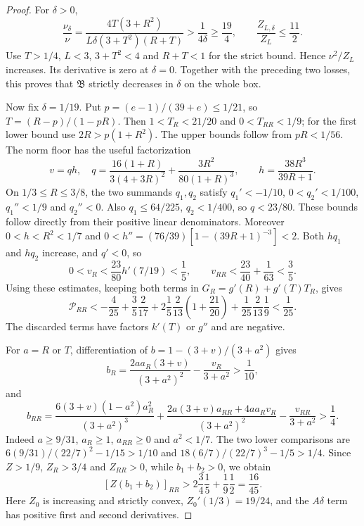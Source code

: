 \begin{proof}
 For $\delta>0$,
\[
 \frac{\nu_\delta}{\nu}
 =\frac{4T(3+R^2)}{L\delta(3+T^2)(R+T)}
 >\frac1{4\delta}\ge\frac{19}{4},
 \qquad
 \frac{Z_{L,\delta}}{Z_L}\le\frac{11}{2}.
\]
Use $T>1/4$, $L<3$, $3+T^2<4$ and $R+T<1$ for the strict bound.
Hence $\nu^2/Z_L$ increases. Its derivative is zero at $\delta=0$.
Together with the preceding two losses, this proves that $\mathfrak B$ strictly decreases
in $\delta$ on the whole box.

 Now fix $\delta=1/19$. Put
$p=(e-1)/(39+e)\le1/21$, so $T=(R-p)/(1-pR)$.
Then $1<T_R<21/20$ and $0<T_{RR}<1/9$; for the first lower bound use
$2R>p(1+R^2)$. The upper bounds follow from $pR<1/56$.
The norm floor has the useful factorization
\[
 v=q h,\quad
 q=\frac{16(1+R)}{3(4+3R)^2}+\frac{3R^2}{80(1+R)^3},\qquad
 h=\frac{38R^3}{39R+1}.
\]
On $1/3\le R\le3/8$, the two summands $q_1,q_2$ satisfy
$q_1'<-1/10$, $0<q_2'<1/100$, $q_1''<1/9$ and $q_2''<0$.
Also $q_1\le64/225$, $q_2<1/400$, so $q<23/80$.
These bounds follow directly from their positive linear denominators. Moreover
$0<h<R^2<1/7$ and $0<h''=(76/39)[1-(39R+1)^{-3}]<2$.
Both $hq_1$ and $hq_2$ increase, and $q'<0$, so
\[
 0<v_R<\frac{23}{80}h'(7/19)<\frac15,\qquad
 v_{RR}<\frac{23}{40}+\frac1{63}<\frac35 .
\]
Using these estimates, keeping both terms in $G_R=g'(R)+g'(T)T_R$, gives
\[
 \mathcal P_{RR}<
 -\frac4{25}+\frac35\frac2{17}
 +2\frac15\frac2{13}\left(1+\frac{21}{20}\right)
 +\frac1{25}\frac2{13}\frac19<\frac1{25}.
\]
The discarded terms have factors $k'(T)$ or $g''$ and are negative.

For $a=R$ or $T$, differentiation of $b=1-(3+v)/(3+a^2)$ gives
\[
 b_R=\frac{2aa_R(3+v)}{(3+a^2)^2}-\frac{v_R}{3+a^2}>\frac1{10},
\]
and
\[
 b_{RR}=
 \frac{6(3+v)(1-a^2)a_R^2}{(3+a^2)^3}
 +\frac{2a(3+v)a_{RR}+4aa_Rv_R}{(3+a^2)^2}
 -\frac{v_{RR}}{3+a^2}>\frac14 .
\]
Indeed $a\ge9/31$, $a_R\ge1$, $a_{RR}\ge0$ and $a^2<1/7$.
The two lower comparisons are
$6(9/31)/(22/7)^2-1/15>1/10$ and
$18(6/7)/(22/7)^3-1/5>1/4$.
Since $Z>1/9$, $Z_R>3/4$ and $Z_{RR}>0$, while $b_1+b_2>0$, we obtain
\[
 [Z(b_1+b_2)]_{RR}>
 2\frac34\frac15+\frac19\frac12=\frac{16}{45}.
\]
Here $Z_0$ is increasing and strictly convex, $Z_0'(1/3)=19/24$, and the $A\delta$ term has
positive first and second derivatives.


\end{proof}
